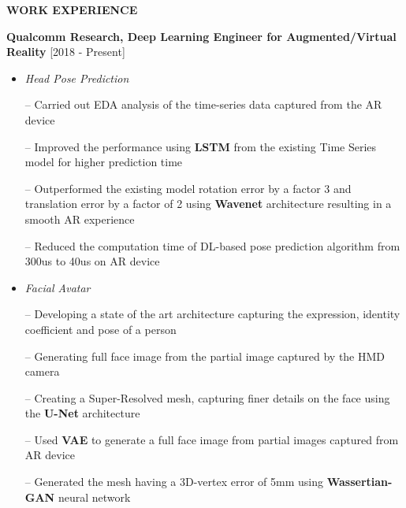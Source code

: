 \documentclass{article}
\begin{document}

\begin{theorem}
   \vspace{-1.2mm}
\begin{center}
\textbf{ WORK EXPERIENCE
}\end{center}  
\vspace{-0.7mm}    
   \end{theorem}
\vspace{-1mm}
\hspace{2.7mm} \textbf{Qualcomm Research, Deep Learning Engineer for Augmented/Virtual Reality} \hfill{[2018 - Present]}
\begin{itemize}
\setlength{\itemsep} {-0.2em}
 \item\textit{Head Pose Prediction}
 \item[--] Carried out EDA analysis of the time-series data captured from the AR device

\item[--] Improved the performance  using \textbf{LSTM} from the existing Time Series model for higher prediction time
\item[--] Outperformed the existing model rotation error by a factor 3 and translation error by a factor of 2 using \textbf{Wavenet} architecture
resulting in a smooth AR experience
\item[--] Reduced the computation time of  DL-based pose prediction algorithm  from 300us to 40us on AR device  


 \item\textit{Facial Avatar}
   \item[--] Developing a state of the art architecture capturing  the expression, identity coefficient and pose of a person
   \item[--] Generating full face image from the partial image captured by the HMD camera
   \item[--] Creating a Super-Resolved mesh, capturing finer details on the face using the \textbf{U-Net} architecture
  \item[--] Used \textbf{VAE}  to generate a full face image from partial images captured from AR device  
   \item[--] Generated the mesh having a 3D-vertex error of 5mm
   using \textbf{Wassertian-GAN} neural network
   
\end{itemize}
\end{document}

